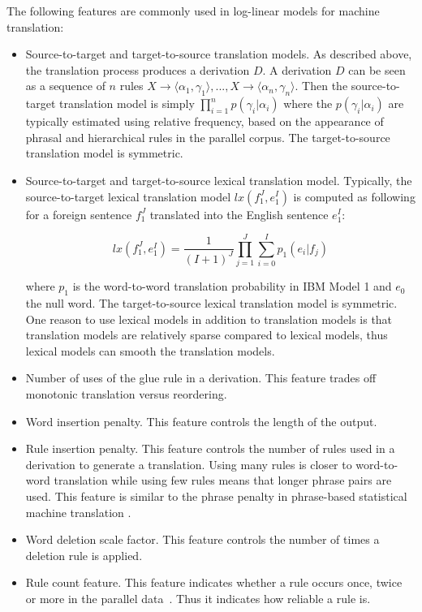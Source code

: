     The following features are commonly used in log-linear models for machine translation:
%    
    \begin{itemize}
      \item Source-to-target and target-to-source translation models. As described above, the 
        translation process produces a derivation $D$. A derivation $D$ can be seen
        as a sequence of $n$ rules 
        $X \rightarrow \langle \alpha_1, \gamma_1 \rangle, ..., X \rightarrow \langle \alpha_n, \gamma_n \rangle$.
        Then the source-to-target translation model is simply $\prod_{i=1}^n p(\gamma_i|\alpha_i)$ where
        the $p(\gamma_i|\alpha_i)$ are typically estimated using relative frequency, based on the appearance 
        of phrasal and hierarchical rules in the parallel corpus.
        The target-to-source 
        translation model is symmetric.
      \item Source-to-target and target-to-source lexical translation model. Typically, the source-to-target lexical translation
        model $lx(f_1^J,e_1^I)$ is computed as following for a foreign sentence $f_1^J$ translated into the English sentence $e_1^I$:

        \begin{equation} \label{eq:lexfeature}
          lx(f_1^J,e_1^I) = \frac{1}{(I+1)^J}\prod_{j=1}^{J} \sum_{i=0}^{I} p_1(e_i|f_j)
        \end{equation}

        \noindent where $p_1$ is the word-to-word translation probability in IBM Model 1 and $e_0$ the null word. The target-to-source lexical translation model is symmetric. One reason to use lexical models in addition to translation models is that translation models are relatively sparse compared
        to lexical models, thus lexical models can smooth the translation models.

      \item Number of uses of the glue rule in a derivation. This feature trades off monotonic translation versus reordering.
      \item Word insertion penalty. This feature controls the length of the output.
      \item Rule insertion penalty. This feature controls the number of rules used in a derivation to generate a translation.
        Using many rules is closer to word-to-word
        translation while using few rules means that longer phrase pairs are used. This feature is similar to the phrase penalty in phrase-based
        statistical machine translation \cite{koehn-och-marcu:2003:NAACL}.
      \item Word deletion scale factor. This feature controls the number of times a deletion rule is applied.
      \item Rule count feature. This feature indicates 
        whether a rule occurs once, twice or more in the parallel data~\citep{bender:07}. Thus it indicates how reliable a rule is.
    \end{itemize}

